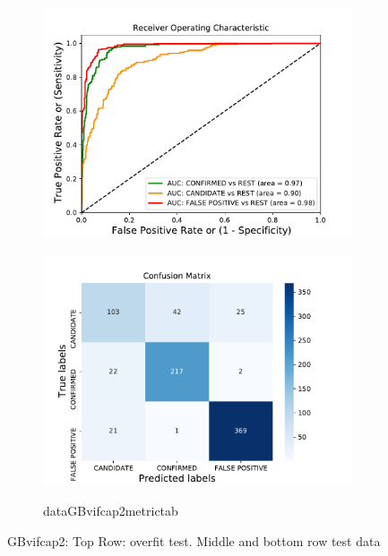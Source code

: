 \begin{figure}[H]
\begin{mdframed}[linecolor=green]
\begin{subfigure}{.49\textwidth}
                \includegraphics[width = 1\textwidth]{data/GB_vif_cap2_roc.pdf}
                \end{subfigure}
                \begin{subfigure}{.49\textwidth}
                \includegraphics[width = 1\textwidth]{data/GB_vif_cap2_cm.pdf}
                \end{subfigure}
                \begin{subfigure}{1\textwidth}
                \csname dataGBvifcap2metrictab\endcsname
                \end{subfigure}
                \caption{GBvifcap2: Top Row: overfit test. Middle and bottom row test data}
                \label{fig:data/GB_vif_cap2_roc}
                \end{mdframed}
                \end{figure}